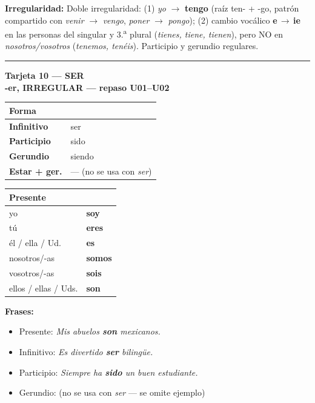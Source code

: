 \documentclass[a4paper,10pt]{article}
\newcommand{\verboheader}[3]{%
  \noindent
  \colorbox{azulverbo!90}{\parbox{\dimexpr\linewidth-2\fboxsep}{%
    \centering\color{white}\bfseries\large Tarjeta #1 --- #2\\[2pt]
    \normalsize #3%
  }}
  \vspace{4pt}
}
\newcommand{\tarjetasep}{%
  \vspace{6pt}
  \noindent\rule{\linewidth}{0.4pt}
  \vspace{6pt}
}
\begin{document}
\begin{trucoverbo}
\textbf{Irregularidad:} Doble irregularidad: (1) \textit{yo} $\to$ \textcolor{rojoirr}{\textbf{tengo}} (raíz ten- + -go, patrón compartido con \textit{venir} $\to$ \textit{vengo}, \textit{poner} $\to$ \textit{pongo}); (2) cambio vocálico \textcolor{rojoirr}{\textbf{e\,$\to$\,ie}} en las personas del singular y 3.\textsuperscript{a} plural (\textit{tienes, tiene, tienen}), pero NO en \textit{nosotros/vosotros} (\textit{tenemos, tenéis}). Participio y gerundio regulares.
\end{trucoverbo}

\tarjetasep

\verboheader{10}{SER}{-er, IRREGULAR --- repaso U01--U02}

\begin{minipage}[t]{0.48\linewidth}
\small
\begin{tabular}{|>{\bfseries}l|l|}
\hline
\rowcolor{azulverbo!15} Forma & \\
\hline
Infinitivo & ser \\
\hline
\rowcolor{grisclaro}
Participio & sido \\
\hline
Gerundio & siendo \\
\hline
\rowcolor{grisclaro}
Estar + ger. & --- (no se usa con \textit{ser}) \\
\hline
\end{tabular}
\end{minipage}
\hfill
\begin{minipage}[t]{0.48\linewidth}
\small
\begin{tabular}{|l|l|}
\hline
\rowcolor{azulverbo!15} \textbf{Presente} & \\
\hline
yo & \textcolor{rojoirr}{\textbf{soy}} \\
\hline
\rowcolor{grisclaro}
tú & \textcolor{rojoirr}{\textbf{eres}} \\
\hline
él / ella / Ud. & \textcolor{rojoirr}{\textbf{es}} \\
\hline
\rowcolor{grisclaro}
nosotros/-as & \textcolor{rojoirr}{\textbf{somos}} \\
\hline
vosotros/-as & \textcolor{rojoirr}{\textbf{sois}} \\
\hline
\rowcolor{grisclaro}
ellos / ellas / Uds. & \textcolor{rojoirr}{\textbf{son}} \\
\hline
\end{tabular}
\end{minipage}

\vspace{4pt}
\small
\textbf{Frases:}
\begin{itemize}[nosep, leftmargin=1em]
\item Presente: \textit{Mis abuelos \textbf{son} mexicanos.}
\item Infinitivo: \textit{Es divertido \textbf{ser} bilingüe.}
\item Participio: \textit{Siempre ha \textbf{sido} un buen estudiante.}
\item Gerundio: (no se usa con \textit{ser} --- se omite ejemplo)
\end{itemize}
\end{document}
